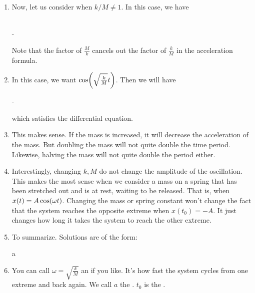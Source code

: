 \begin{enumerate}
  \item Now, let us consider when $k/M \ne 1$. In this case, we have

  \begin{nedqn}
     
  \eqcol
  \\
  \eqcol
    -  
  \end{nedqn}

  \noindent
  Note that the factor of $\frac{M}{k}$ cancels out the factor of
  $\frac{k}{M}$ in the acceleration formula.

  \item In this case, we want $\cos\mathopen{}\left( {\sqrt{\frac{k}{M}} t} \right)\mathclose{}$. Then we
  will have

  \begin{nedqn}
     
  \eqcol
    -  
  \end{nedqn}

  \noindent
  which satisfies the differential equation.

  \item This makes sense. If the mass is increased, it will decrease the
  acceleration of the mass. But doubling the mass will not quite double
  the time period. Likewise, halving the mass will not quite double the
  period either.

  \item Interestingly, changing $k, M$ do not change the amplitude of
  the oscillation. This makes the most sense when we consider a mass on
  a spring that has been stretched out and is at rest, waiting to be
  released. That is, when $x\mathopen{}\left( {t} \right)\mathclose{} = A \cos\mathopen{}\left( {\omega t} \right)\mathclose{}$. Changing the mass
  or spring constant won't change the fact that the system reaches the
  opposite extreme when $x(t_0) = -A$. It just changes how long it takes
  the system to reach the other extreme.

  \item To summarize. Solutions are of the form:

  \begin{nedqn}
  \eqcol
    a 
  \end{nedqn}

  \item You can call $\omega = \sqrt{\frac{k}{M}}$ an  if you like. It's how fast the system cycles from one
  extreme and back again. We call $a$ the . $t_0$ is
  the .

\end{enumerate}


